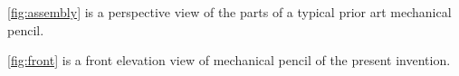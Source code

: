 
\pa
\mbox{\ref{fig:assembly}} is a perspective view of the parts of a typical prior art mechanical pencil.

\pa
\mbox{\ref{fig:front}} is a front elevation view of mechanical pencil of the present invention.


